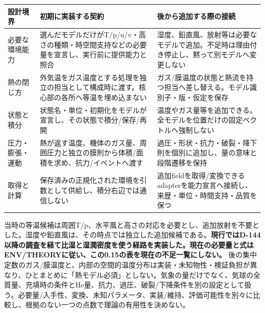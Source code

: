 \documentclass[11pt,a4paper]{article}
\newcounter{none}
\begin{document}
{\def\LTcaptype{none} %
\begin{longtable}[]{@{}
  >{\raggedright\arraybackslash}p{}
  >{\raggedright\arraybackslash}p{}
  >{\raggedright\arraybackslash}p{}@{}}
\toprule\noalign{}
\begin{minipage}[b]{\linewidth}\raggedright
設計境界
\end{minipage} & \begin{minipage}[b]{\linewidth}\raggedright
初期に実装する契約
\end{minipage} & \begin{minipage}[b]{\linewidth}\raggedright
後から追加する際の接続
\end{minipage} \\
\midrule\noalign{}
\endhead
\bottomrule\noalign{}
\endlastfoot
必要な環境能力 &
選んだモデルだけがT/p/u/v・高さの種類・時空間支持などの必要量を宣言し、実行前に提供能力と照合
&
湿度、鉛直風、放射等は必要なモデルで追加。不足時は理由付き停止し、黙って別モデルへ変更しない \\
熱の閉じ方 &
外気温をガス温度とする処理を独立の担当として構成時に渡す。核心部の各所へ等温を埋め込まない
&
ガス/膜温度の状態と熱流を持つ担当へ差し替える。モデル識別子・版・仮定を保存 \\
状態と積分 &
状態名・単位・初期化をモデルが宣言し、その状態で積分/保存/再開 &
温度やガス量等を追加できる。全モデルを位置だけの固定ベクトルへ強制しない \\
圧力・膨張・運動 &
熱が返す温度、機体のガス量、周囲圧力と独立の膜則から体積/面積を求め、抗力/イベントへ渡す
&
過圧・形状・抗力・破裂・降下則を個別に追加し、量の意味と段階遷移を保持 \\
取得と計算 &
保存済みの正規化された環境を引数として供給し、積分右辺では通信しない &
追加fieldを取得/変換できるadapterを能力宣言へ接続し、来歴・単位・時間支持・品質を保つ \\
\end{longtable}
}

当時の等温候補は周囲T/p、水平風と高さの対応を必要とし、追加放射を不要とした。湿度や鉛直風は、その時点では独立した追加候補である。\textbf{現行ではD-144以降の調査を経て比湿と湿潤密度を使う経路を実装した。現在の必要量と式はENV/THEORYに従い、この0.15の表を現在の不足一覧にしない。}
後の集中定数のガス/膜温度と、内部の空間的温度分布は実装・未知物性・検証負担が異なり、ひとまとめに「熱モデル必須」としない。気象の量だけでなく、気球の全質量、充填時の条件とHe量、抗力、過圧、破裂/下降条件を別の設定として扱う。必要量/入手性、変換、未知パラメータ、実装/維持、評価可能性を別々に比較し、根拠のない一つの点数で理論の有用性を決めない。
\end{document}
